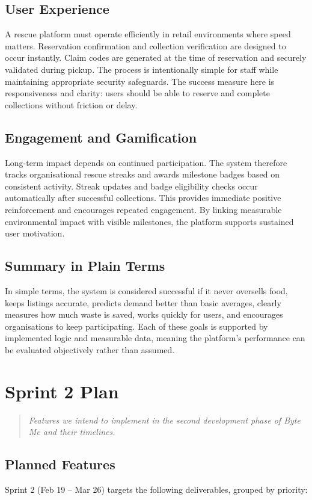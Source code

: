 \documentclass[11pt, a4paper]{report}
\newenvironment{motivation}{\begin{quotation}\noindent\small\itshape}{\end{quotation}}
\begin{document}
\section{User Experience}
A rescue platform must operate efficiently in retail environments where speed matters.
Reservation confirmation and collection verification are designed to occur instantly. Claim codes are generated at the time of reservation and securely validated during pickup. The process is intentionally simple for staff while maintaining appropriate security safeguards.
The success measure here is responsiveness and clarity: users should be able to reserve and complete collections without friction or delay.

\section{Engagement and Gamification}
Long-term impact depends on continued participation. The system therefore tracks organisational rescue streaks and awards milestone badges based on consistent activity.
Streak updates and badge eligibility checks occur automatically after successful collections. This provides immediate positive reinforcement and encourages repeated engagement.
By linking measurable environmental impact with visible milestones, the platform supports sustained user motivation.

\section*{Summary in Plain Terms}
In simple terms, the system is considered successful if it never oversells food, keeps listings accurate, predicts demand better than basic averages, clearly measures how much waste is saved, works quickly for users, and encourages organisations to keep participating. Each of these goals is supported by implemented logic and measurable data, meaning the platform’s performance can be evaluated objectively rather than assumed.

\chapter{Sprint 2 Plan}
\begin{motivation}
Features we intend to implement in the second development phase of Byte Me and their timelines.
\end{motivation}

\section{Planned Features}
Sprint 2 (Feb 19 -- Mar 26) targets the following deliverables, grouped by priority:
\end{document}
